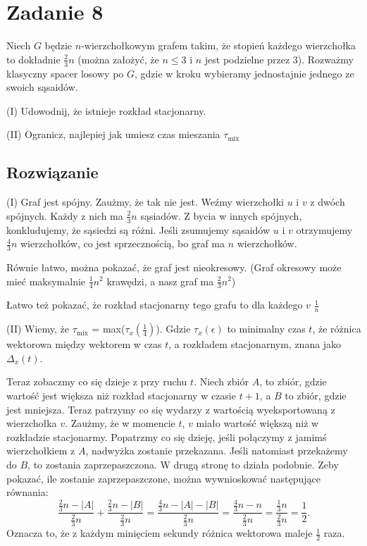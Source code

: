 \section{Zadanie 8}
Niech \(G\) będzie \(n\)-wierzchołkowym grafem takim, że stopień każdego wierzchołka to dokładnie \(\frac{2}{3} n\) (można założyć, że \( n \leq 3\) i \(n\) jest podzielne przez \(3\)). Rozważmy klasyczny spacer losowy po \(G\), gdzie w kroku wybieramy jednostajnie jednego ze swoich sąsaidów.

(I) Udowodnij, że istnieje rozkład stacjonarny.

(II) Ogranicz, najlepiej jak umiesz czas mieszania \(\tau_{\text{mix}}
\)
\subsection*{Rozwiązanie}
(I) Graf jest spójny. Zaużmy, że tak nie jest. Weźmy wierzchołki \(u\) i \(v\) z dwóch spójnych. Każdy z nich ma \(\frac{2}{3}n\) sąsiadów. Z bycia w innych spójnych, konkludujemy, że sąsiedzi są różni. Jeśli zsumujemy sąsaidów \(u\) i \(v\) otrzymujemy \(\frac{4}{3}n\) wierzchołków, co jest sprzecznością, bo graf ma \(n\) wierzchołków.

Równie łatwo, można pokazać, że graf jest nieokresowy. (Graf okresowy może mieć maksymalnie \(\frac{1}{4}n^2\) krawędzi, a nasz graf ma \(\frac{2}{3}n^2\))

Łatwo też pokazać, że rozkład stacjonarny tego grafu to dla każdego \(v\) \(\frac{1}{n}\)


(II) Wiemy, że \(\tau_{\text{mix}}\) = max(\(\tau_x(\frac{1}{4})\)). Gdzie
\(\tau_x(\epsilon)\) to minimalny czas \(t\), że różnica wektorowa między wektorem w czas \(t\), a rozkładem stacjonarnym, znana jako \(\Delta_x(t)\).

Teraz zobaczmy co się dzieje z przy ruchu \(t\). Niech zbiór \(A\), to zbiór, gdzie wartość jest większa niż rozkład stacjonarny w czasie \(t+1\), a \(B\) to zbiór, gdzie jest mniejsza. Teraz patrzymy co się wydarzy z wartością wyeksportowaną z wierzchołka \(v\). Zaużmy, że w momencie \(t\), \(v\) miało wartość większą niż w rozkładzie stacjonarmy. Popatrzmy co się dzieję, jeśli połączymy z jamimś wierzchołkiem z \(A\), nadwyżka zostanie przekazana. Jeśli natomiast przekażemy do \(B\), to zostania zaprzepaszczona. W drugą stronę to działa podobnie. Zeby pokazać, ile zostanie zaprzepaszczone, można wywnioskować następujące równania:
\[
	\frac{\frac{2}{3}n - |A|}{ \frac{2}{3}n}  + \frac{\frac{2}{3}n - |B|}{ \frac{2}{3}n} = \frac{\frac{4}{3}n - |A| - |B|}{\frac{2}{3}n} = \frac{\frac{4}{3}n - n}{\frac{2}{3}n} = \frac{\frac{1}{3}n}{\frac{2}{3}n} = \frac{1}{2}.
\]
Oznacza to, że z każdym minięciem sekundy różnica wektorowa maleje \(\frac{1}{2}\) raza.

